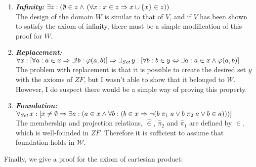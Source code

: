 \documentclass[11pt]{report}
\newcommand{\all}[1]{\forall_{\mathit{#1}}\hspace{0.5mm}}
\newcommand{\ex}[1]{\exists_{\mathit{#1}}\hspace{0.5mm}}
\newcommand{\pleft}{\mathrel{\pi_1}}
\newcommand{\pright}{\mathrel{\pi_2}}
\newcommand{\zin}{\mathrel{\widehat{\in}}}
\newcommand{\zpright}{\mathrel{\widehat{\pi}_2}}
\newcommand{\zpleft}{\mathrel{\widehat{\pi}_1}}
\theoremstyle{definition}
\theoremstyle{theorem}
\theoremstyle{lemma}
\begin{document}
\begin{enumerate}[resume=axiomlist, label=\Roman*.]
\item  \textit{\textbf{Infinity: }} 
$\exists z: (\emptyset\in z \wedge\hspace{0.6mm} (\forall x: x\in z \Rightarrow x\cup\{x\}\in z))$ \\ 
The design of the domain $W$ is similar to that of $V$, and if $V$ has been shown to satisfy the axiom of infinity, there must be a simple modification of this proof for $W$.

\item \textit{\textbf{Replacement: }}\\
$\forall x: [\forall a: a\in x \Rightarrow \exists!b: \varphi(a,b)]
  \Rightarrow \ex{Set} y:[\forall b: b\in y \Leftrightarrow
                                     \exists a: a\in x \wedge\varphi(a,b)]$\\
The problem with replacement is that it is possible to create the desired set $y$ with the axioms of $\mathit{ZF}$, but I wasn't able to show that it belonged to $W$.
However, I do suspect there would be a simple way of proving this property. 

\item \textit{\textbf{Foundation:} } \\$\all{Set} x: [x\neq\emptyset
  \Rightarrow \exists a: (a\in x \wedge
               \forall b: (b\in x
               \Rightarrow \neg(b\pleft a \vee b\pright a \vee b\in a)))]$\\
The membership and projection relations, $\zin$, $\zpright$ and $\zpleft$ are defined by $\in$, which is well-founded in $\mathit{ZF}$.
Therefore it is sufficient to assume that foundation holds in $\mathcal{W}$.
\end{enumerate}
Finally, we give a proof for the axiom of cartesian product:
\end{document}
